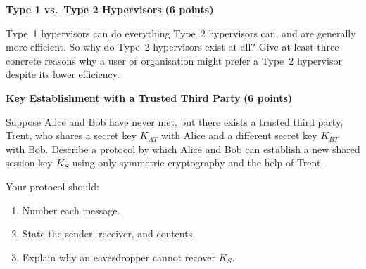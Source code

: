 \documentclass[10pt,answers]{exam}
\newcommand{\qpoints}[1]{\hfill \textbf{(#1 points)}}
\begin{document}
\begin{questions}
\question \textbf{Type 1 vs.\ Type 2 Hypervisors} \qpoints{6}

Type~1 hypervisors can do everything Type~2 hypervisors can, and are generally more efficient.
So why do Type~2 hypervisors exist at all?
Give at least three concrete reasons why a user or organisation might prefer a Type~2 hypervisor despite its lower efficiency.

\begin{solution}
\end{solution}


\question \textbf{Key Establishment with a Trusted Third Party} \qpoints{6}

Suppose Alice and Bob have never met, but there exists a trusted third party, Trent, who shares a secret key $K_{AT}$ with Alice and a different secret key $K_{BT}$ with Bob.
Describe a protocol by which Alice and Bob can establish a new shared session key $K_S$ using only symmetric cryptography and the help of Trent.

Your protocol should:
\begin{enumerate}[nosep]
    \item Number each message.
    \item State the sender, receiver, and contents.
    \item Explain why an eavesdropper cannot recover $K_S$.
\end{enumerate}

\begin{solution}
\end{solution}


\end{questions}
\end{document}
